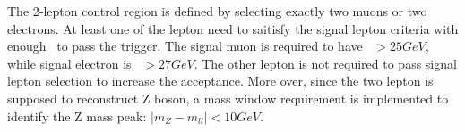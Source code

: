 \par The 2-lepton control region is defined by selecting exactly two muons or two electrons. At least one of the lepton need to saitisfy the signal lepton criteria with enough \pt~to pass the trigger. The signal muon is required to have \pt~$>25GeV$, while signal electron is \pt~$>27GeV$. The other lepton is not required to pass signal lepton selection to increase the acceptance. More over, since the two lepton is supposed to reconstruct Z boson, a mass window requirement is implemented to identify the Z mass peak: $|m_{Z}-m_{ll}|<10GeV$.

